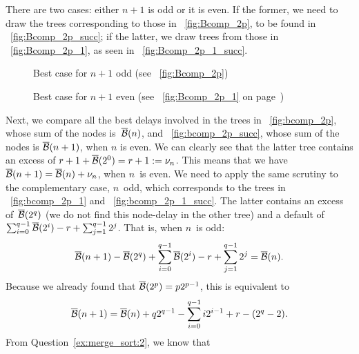 There are two cases: either \(n+1\) is odd or it is even. If the
former, we need to draw the trees corresponding to those in
\fig~\vref{fig:Bcomp_2p}, to be found in
\fig~\vref{fig:Bcomp_2p_succ}; if the latter, we draw trees from those
in \fig~\vref{fig:Bcomp_2p_1}, as seen in
\fig~\vref{fig:Bcomp_2p_1_succ}.
\begin{figure}[t]
\centering
{}
\quad
{}
\caption{Best case for \(n+1\) odd (see \fig~\vref{fig:Bcomp_2p})
\label{fig:Bcomp_2p_succ}}
\end{figure}
\begin{figure}[!b]
\centering
{}
\qquad
{}
\caption{Best case for \(n+1\) even (see \fig~\ref{fig:Bcomp_2p_1} on
  page~\pageref{fig:Bcomp_2p_1})
\label{fig:Bcomp_2p_1_succ}}
\end{figure}
Next, we compare all the best delays involved in the trees in
\fig~\vref{fig:bcomp_2p}, whose sum of the nodes is~\(\overline{\mathcal{B}}(n)\), and
\fig~\vref{fig:bcomp_2p_succ}, whose sum of the nodes is
\(\overline{\mathcal{B}}(n+1)\), when \(n\) is even. We can clearly see that the
latter tree contains an excess of \(r + 1 + \overline{\mathcal{B}}(2^0) = r+1 :=
\nu_n\). This means that we have \(\overline{\mathcal{B}}(n+1) = \overline{\mathcal{B}}(n) + \nu_n\),
when \(n\)~is even. We need to apply the same scrutiny to the
complementary case, \(n\)~odd, which corresponds to the trees in
\fig~\vref{fig:bcomp_2p_1} and \fig~\vref{fig:bcomp_2p_1_succ}. The
latter contains an excess of~\(\overline{\mathcal{B}}(2^q)\) (we do not find this
node\hyp{}delay in the other tree) and a default of
\(\sum_{i=0}^{q-1}{\overline{\mathcal{B}}(2^i)} - r + \sum_{j=1}^{q-1}{2^j}\). That
is, when \(n\)~is odd:
\begin{equation*}
\overline{\mathcal{B}}(n+1) - \overline{\mathcal{B}}(2^q) + \sum_{i=0}^{q-1}{\overline{\mathcal{B}}(2^i)}
- r + \sum_{j=1}^{q-1}{2^j} = \overline{\mathcal{B}}(n).
\end{equation*}
Because we already found that \(\overline{\mathcal{B}}(2^p) = p 2^{p-1}\), this is
equivalent to
\begin{equation*}
\overline{\mathcal{B}}(n+1) = \overline{\mathcal{B}}(n) + q2^{q-1} - \sum_{i=0}^{q-1}{i2^{i-1}} + r - (2^q - 2).
\end{equation*}
From Question~\ref{ex:merge_sort:2}, we know that
